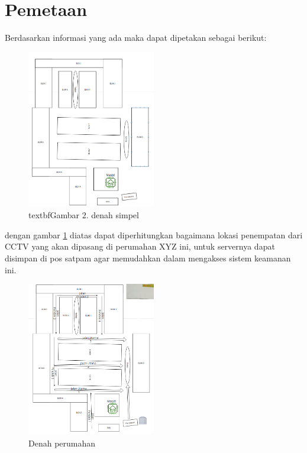 \documentclass[a4paper, 12pt]{article}
\begin{document}
\section{Pemetaan}
Berdasarkan informasi yang ada maka dapat dipetakan sebagai berikut:
\begin{figure}[ht]
  \begin{center}
    \includegraphics[width=0.5\textwidth]{images/layout.png}
  \end{center}
  \caption{textbf{Gambar 2}. denah simpel}\label{fig:denah}
\end{figure}
dengan gambar \ref{fig:denah} diatas dapat diperhitungkan bagaimana lokasi penempatan dari CCTV yang akan dipasang di perumahan XYZ ini, untuk servernya dapat disimpan di pos satpam agar memudahkan dalam mengakses sistem keamanan ini.
\pagebreak
\begin{figure}[hb!]
  \begin{center}
    \includegraphics[width=0.5\textwidth]{images/cctv.png}
  \end{center}
  \caption{Denah perumahan}\label{fig:cctv}
\end{figure}
\end{document}
